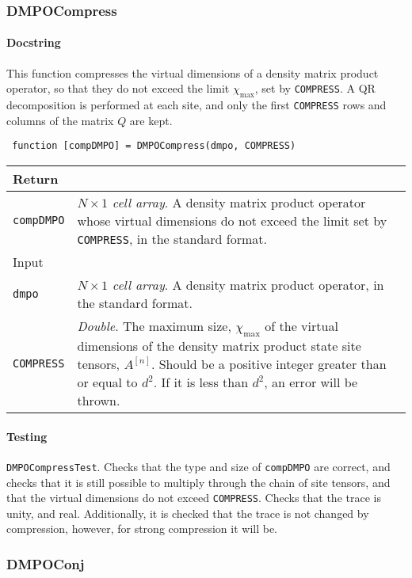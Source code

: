  \subsubsection{DMPOCompress}
 \paragraph{Docstring} This function compresses the virtual dimensions of a density matrix product operator, so that they do not exceed the limit \(\chi_{\mathrm{max}}\), set by \lstinline$COMPRESS$. A QR decomposition is performed at each site, and only the first \lstinline$COMPRESS$ rows and columns of the matrix \(Q\) are kept. 
 \begin{lstlisting}
 function [compDMPO] = DMPOCompress(dmpo, COMPRESS) \end{lstlisting}
 \begin{longtabu}{X[1,l]X[4,l]}
 \hline
 Return & \\ \hline
 \lstinline$compDMPO$ & \emph{\(N \times 1\) cell array}. A density matrix product operator whose virtual dimensions do not exceed the limit set by \lstinline$COMPRESS$, in the standard format. \\ \hline
 Input & \\ \hline
 \lstinline$dmpo$ & \emph{\(N \times 1\) cell array}. A density matrix product operator, in the standard format. \\
 \lstinline$COMPRESS$ & \emph{Double}. The maximum size, \(\chi_{\mathrm{max}}\) of the virtual dimensions of the density matrix product state site tensors, \(A^{[n]}\). Should be a positive integer greater than or equal to \(d^{2}\). If it is less than \(d^{2}\), an error will be thrown. \\
 \hline
 \end{longtabu}
 \paragraph{Testing} \lstinline$DMPOCompressTest$. Checks that the type and size of \lstinline$compDMPO$ are correct, and checks that it is still possible to multiply through the chain of site tensors, and that the virtual dimensions do not exceed \lstinline$COMPRESS$. Checks that the trace is unity, and real. Additionally, it is checked that the trace is not changed by compression, however, for strong compression it will be.
 
 \subsubsection{DMPOConj}
